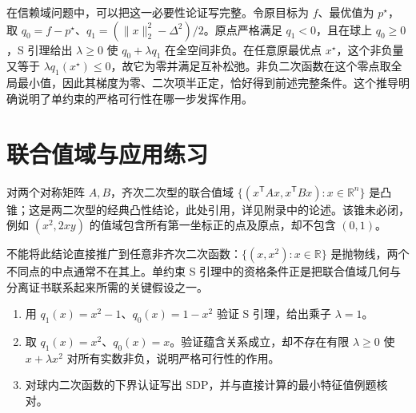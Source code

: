 在信赖域问题中，可以把这一必要性论证写完整。令原目标为 $f$、最优值为 $p^\star$，取 $q_0=f-p^\star$、$q_1=(\|x\|_2^2-\Delta^2)/2$。原点严格满足 $q_1<0$，且在球上 $q_0\geq0$，S 引理给出 $\lambda\geq0$ 使 $q_0+\lambda q_1$ 在全空间非负。在任意原最优点 $x^\star$，这个非负量又等于 $\lambda q_1(x^\star)\leq0$，故它为零并满足互补松弛。非负二次函数在这个零点取全局最小值，因此其梯度为零、二次项半正定，恰好得到前述完整条件。这个推导明确说明了单约束的严格可行性在哪一步发挥作用。

\section{联合值域与应用练习}

对两个对称矩阵 $A,B$，齐次二次型的联合值域 $\{(x^{\mathsf T}Ax,x^{\mathsf T}Bx):x\in\mathbb R^n\}$ 是凸锥；这是两二次型的经典凸性结论，此处引用，详见\cite{boyd-vandenberghe}附录中的论述。该锥未必闭，例如 $(x^2,2xy)$ 的值域包含所有第一坐标正的点及原点，却不包含 $(0,1)$。

不能将此结论直接推广到任意非齐次二次函数：$\{(x,x^2):x\in\mathbb R\}$ 是抛物线，两个不同点的中点通常不在其上。单约束 S 引理中的资格条件正是把联合值域几何与分离证书联系起来所需的关键假设之一。

\begin{enumerate}
 \item 用 $q_1(x)=x^2-1$、$q_0(x)=1-x^2$ 验证 S 引理，给出乘子 $\lambda=1$。
 \item 取 $q_1(x)=x^2$、$q_0(x)=x$。验证蕴含关系成立，却不存在有限 $\lambda\geq0$ 使 $x+\lambda x^2$ 对所有实数非负，说明严格可行性的作用。
 \item 对球内二次函数的下界认证写出 SDP，并与直接计算的最小特征值例题核对。
\end{enumerate}

